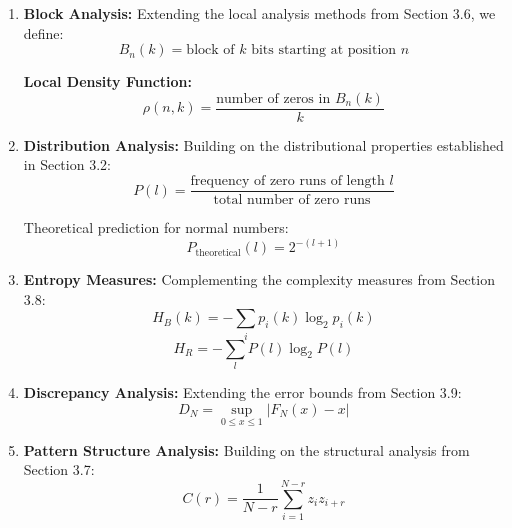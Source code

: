 \begin{enumerate}
    \item \textbf{Block Analysis:} Extending the local analysis methods from Section 3.6, we define:
    \begin{equation}
        B_n(k) = \text{block of } k \text{ bits starting at position } n
    \end{equation}
    
    \textbf{Local Density Function:} 
    \begin{equation}
        \rho(n,k) = \frac{\text{number of zeros in }B_n(k)}{k}
    \end{equation}

    \item \textbf{Distribution Analysis:} Building on the distributional properties established in Section 3.2:
    \begin{equation}
        P(l) = \frac{\text{frequency of zero runs of length }l}{\text{total number of zero runs}}
    \end{equation}
    
    Theoretical prediction for normal numbers:
    \begin{equation}
        P_{\text{theoretical}}(l) = 2^{-(l+1)}
    \end{equation}

    \item \textbf{Entropy Measures:} Complementing the complexity measures from Section 3.8:
    \begin{equation}
        H_B(k) = -\sum_{i} p_i(k) \log_2 p_i(k)
    \end{equation}
    \begin{equation}
        H_R = -\sum_{l} P(l) \log_2 P(l)
    \end{equation}

    \item \textbf{Discrepancy Analysis:} Extending the error bounds from Section 3.9:
    \begin{equation}
        D_N = \sup_{0 \leq x \leq 1} |F_N(x) - x|
    \end{equation}

    \item \textbf{Pattern Structure Analysis:} Building on the structural analysis from Section 3.7:
    \begin{equation}
        C(r) = \frac{1}{N-r} \sum_{i=1}^{N-r} z_i z_{i+r}
    \end{equation}
\end{enumerate}

